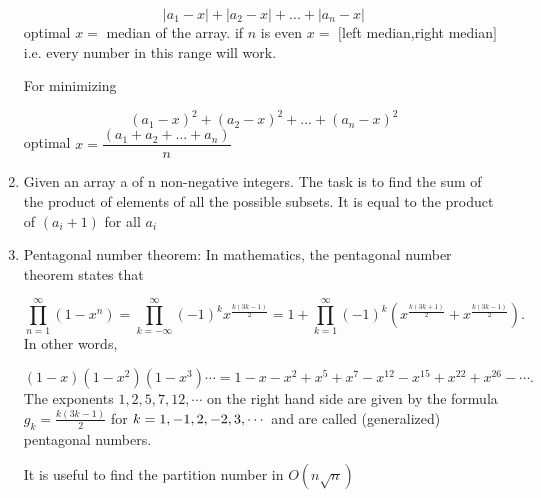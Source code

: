 \begin{enumerate}
                \[|a_1 - x| + |a_2 - x| + ... + |a_n - x|\]
                optimal $\displaystyle x=$ median of the array.
                    if $n$ is even $\displaystyle x =$ $[$left median,right median$]$ i.e. every number in this range
                    will
                    work.
                

                For minimizing

                \[\displaystyle (a_1 - x)^2 + (a_2 - x)^2 + ... + (a_n - x)^2\]
                optimal $\displaystyle x = \dfrac{(a_1 + a_2 + … + a_n)}{ n}$

            
            \item Given an array a of n non-negative integers. The task is to find the sum of the product of elements of
                all
                the
                possible subsets. It is equal to the product of $\displaystyle (a_i + 1)$ for all $\displaystyle a_i$
            
            \item 
                Pentagonal number theorem:
                    In mathematics, the pentagonal number theorem states that

                \[\displaystyle \prod_{n = 1}^{\infty}\left ( 1 - x^n \right ) = \prod_{k = -\infty}^{\infty} \left ( -1
                \right
                )^kx^{\frac{k(3k - 1)}{2}} = 1 + \prod_{k = 1}^{\infty}\left (-1\right )^k\left ( x^{\frac{k(3k +
                1)}{2}} +
                x^{\frac{k(3k - 1)}{2}}\right ).\]
                In other words,

                \[\displaystyle (1 - x)(1 - x ^ 2)(1 - x^3)\cdots =1 - x - x^2 + x^5 + x^7 - x^{12} - x^{15} + x^{22} +
                x^{26} -
                \cdots.\]
                The exponents $\displaystyle 1, 2, 5, 7, 12,\cdots$ on the right hand side are given by the formula
                    $g_k
                    =
                    \frac{k(3k - 1)}{2}$ for $\displaystyle \displaystyle k = 1, -1, 2, -2, 3, \cdots$ and are called
                    (generalized) pentagonal numbers.

                It is useful to find the partition
                        number in $O(n \sqrt{n})$

                \end{enumerate}
